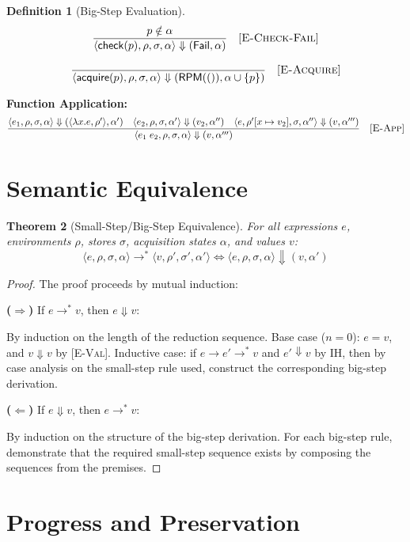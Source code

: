 \documentclass[11pt,twoside,openright]{book}
\theoremstyle{definition}
\newtheorem{definition}{Definition}[chapter]
\theoremstyle{plain}
\newtheorem{theorem}[definition]{Theorem}
\theoremstyle{remark}
\newcommand{\smallstep}{\to}
\newcommand{\bigstep}{\Downarrow}
\newcommand{\Failed}{\mathsf{Fail}}
\begin{document}
\begin{definition}[Big-Step Evaluation]
\[
\frac{p \notin \alpha}{\langle \mathsf{check}(p), \rho, \sigma, \alpha \rangle \bigstep (\Failed, \alpha)} \quad [\textsc{E-Check-Fail}]
\]

\[
\frac{}{\langle \mathsf{acquire}(p), \rho, \sigma, \alpha \rangle \bigstep (\mathsf{RPM}(()), \alpha \cup \{p\})} \quad [\textsc{E-Acquire}]
\]

\textbf{Function Application:}
\[
\frac{\langle e_1, \rho, \sigma, \alpha \rangle \bigstep (\langle \lambda x.e, \rho' \rangle, \alpha') \quad \langle e_2, \rho, \sigma, \alpha' \rangle \bigstep (v_2, \alpha'') \quad \langle e, \rho'[x \mapsto v_2], \sigma, \alpha'' \rangle \bigstep (v, \alpha''')}{\langle e_1\; e_2, \rho, \sigma, \alpha \rangle \bigstep (v, \alpha''')} \quad [\textsc{E-App}]
\]
\end{definition}

\section{Semantic Equivalence}

\begin{theorem}[Small-Step/Big-Step Equivalence]
\label{thm:semantic-equivalence}
For all expressions $e$, environments $\rho$, stores $\sigma$, acquisition states $\alpha$, and values $v$:
\[
\langle e, \rho, \sigma, \alpha \rangle \smallstep^* \langle v, \rho', \sigma', \alpha' \rangle \iff \langle e, \rho, \sigma, \alpha \rangle \bigstep (v, \alpha')
\]
\end{theorem}

\begin{proof}
The proof proceeds by mutual induction:

\textbf{($\Rightarrow$)} If $e \smallstep^* v$, then $e \bigstep v$:

By induction on the length of the reduction sequence. Base case ($n=0$): $e = v$, and $v \bigstep v$ by [\textsc{E-Val}]. Inductive case: if $e \smallstep e' \smallstep^* v$ and $e' \bigstep v$ by IH, then by case analysis on the small-step rule used, construct the corresponding big-step derivation.

\textbf{($\Leftarrow$)} If $e \bigstep v$, then $e \smallstep^* v$:

By induction on the structure of the big-step derivation. For each big-step rule, demonstrate that the required small-step sequence exists by composing the sequences from the premises.
\end{proof}

\section{Progress and Preservation}
\end{document}
